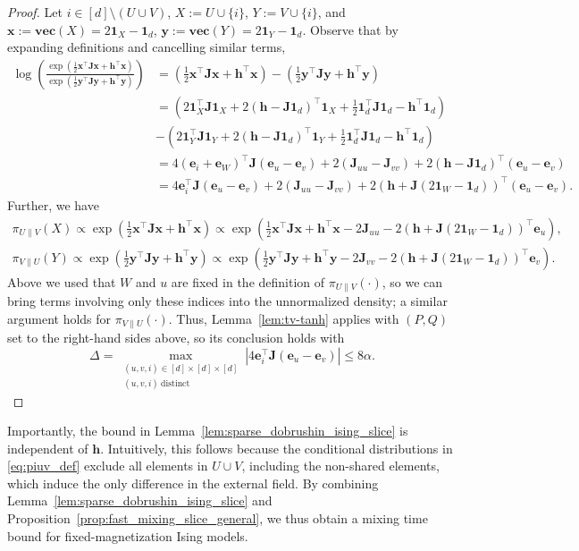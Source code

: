 \documentclass[11pt]{article}
\newcommand{\defeq}{:=}
\newcommand{\half}{\frac{1}{2}}
\newcommand{\1}{\mathbf{1}}
\newcommand{\0}{\mathbf{0}}
\newcommand{\Par}[1]{\left(#1\right)}
\newcommand{\Abs}[1]{\left|#1\right|}
\newcommand{\vone}{\mathbf{1}}
\newcommand{\mj}{{\mathbf{J}}}
\newcommand{\ve}{{\mathbf{e}}}
\newcommand{\vh}{{\mathbf{h}}}
\newcommand{\vx}{{\mathbf{x}}}
\newcommand{\vy}{{\mathbf{y}}}
\newcommand{\vvec}{\mathbf{vec}}
\begin{document}
\begin{proof}
Let $i \in [d] \setminus (U \cup V)$, $X \defeq U \cup \{i\}$, $Y \defeq V \cup \{i\}$, and $\vx \defeq \vvec(X) = 2\vone_X - \vone_d$, $\vy \defeq \vvec(Y) = 2\vone_Y - \vone_d$. Observe that by expanding definitions and cancelling similar terms,
\begin{align*}
\log\Par{\frac{\exp(\half \vx^\top \mj \vx + \vh^\top \vx)}{\exp(\half \vy^\top \mj \vy + \vh^\top \vy)}} &= \Par{\half \vx^\top \mj \vx + \vh^\top \vx} - \Par{\half \vy^\top \mj \vy + \vh^\top \vy} \\
&= \Par{2\1_X^\top \mj \1_X + 2\Par{\vh - \mj \1_d}^\top \1_X + \half \1_d^\top \mj \1_d - \vh^\top \1_d} \\
&- \Par{2\1_Y^\top \mj \1_Y + 2\Par{\vh - \mj \1_d}^\top \1_Y + \half \1_d^\top \mj \1_d - \vh^\top \1_d} \\
&= 4\Par{\ve_i + \ve_W}^\top \mj(\ve_u - \ve_v) + 2\Par{\mj_{uu} - \mj_{vv}} + 2(\vh - \mj \1_d)^\top(\ve_u - \ve_v) \\
&= 4\ve_i^\top \mj(\ve_u - \ve_v) + 2(\mj_{uu} - \mj_{vv}) + 2\Par{\vh + \mj(2\1_W - \1_d)}^\top(\ve_u - \ve_v).
\end{align*}
Further, we have
\begin{align*}
\pi_{U \| V}(X) \propto \exp\Par{\half \vx^\top \mj \vx + \vh^\top \vx} \propto \exp\Par{\half \vx^\top \mj \vx + \vh^\top \vx - 2\mj_{uu} - 2(\vh + \mj(2\1_W - \1_d))^\top \ve_u}, \\
\pi_{V \| U}(Y) \propto \exp\Par{\half \vy^\top \mj \vy + \vh^\top \vy} \propto \exp\Par{\half \vy^\top \mj \vy + \vh^\top \vy - 2\mj_{vv} - 2(\vh + \mj(2\1_W - \1_d))^\top \ve_v}.
\end{align*}
Above we used that $W$ and $u$ are fixed in the definition of $\pi_{U \| V}(\cdot)$, so we can bring terms involving only these indices into the unnormalized density; a similar argument holds for $\pi_{V \| U}(\cdot)$. Thus, Lemma~\ref{lem:tv-tanh} applies with $(P, Q)$ set to the right-hand sides above, so its conclusion holds with
\[\Delta = \max_{\substack{(u, v, i) \in [d] \times [d] \times [d] \\ (u, v,i) \ \text{distinct}}}\Abs{4\ve_i^\top \mj(\ve_u - \ve_v)} \le 8\alpha. \]
\end{proof}

Importantly, the bound in Lemma~\ref{lem:sparse_dobrushin_ising_slice} is independent of $\vh$. Intuitively, this follows because the conditional distributions in \eqref{eq:piuv_def} exclude all elements in $U \cup V$, including the non-shared elements, which induce the only difference in the external field. By combining Lemma~\ref{lem:sparse_dobrushin_ising_slice} and Proposition~\ref{prop:fast_mixing_slice_general}, we thus obtain a mixing time bound for fixed-magnetization Ising models.
\end{document}
